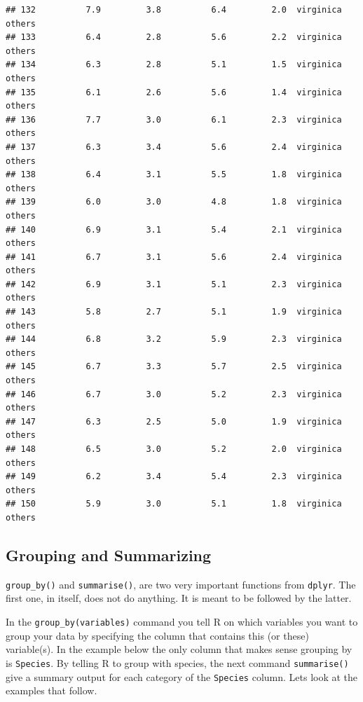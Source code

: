\documentclass[
]{book}
\begin{document}
\begin{verbatim}
## 132          7.9         3.8          6.4         2.0  virginica     others
## 133          6.4         2.8          5.6         2.2  virginica     others
## 134          6.3         2.8          5.1         1.5  virginica     others
## 135          6.1         2.6          5.6         1.4  virginica     others
## 136          7.7         3.0          6.1         2.3  virginica     others
## 137          6.3         3.4          5.6         2.4  virginica     others
## 138          6.4         3.1          5.5         1.8  virginica     others
## 139          6.0         3.0          4.8         1.8  virginica     others
## 140          6.9         3.1          5.4         2.1  virginica     others
## 141          6.7         3.1          5.6         2.4  virginica     others
## 142          6.9         3.1          5.1         2.3  virginica     others
## 143          5.8         2.7          5.1         1.9  virginica     others
## 144          6.8         3.2          5.9         2.3  virginica     others
## 145          6.7         3.3          5.7         2.5  virginica     others
## 146          6.7         3.0          5.2         2.3  virginica     others
## 147          6.3         2.5          5.0         1.9  virginica     others
## 148          6.5         3.0          5.2         2.0  virginica     others
## 149          6.2         3.4          5.4         2.3  virginica     others
## 150          5.9         3.0          5.1         1.8  virginica     others
\end{verbatim}

\hypertarget{grouping-and-summarizing}{%
\subsection{Grouping and Summarizing}\label{grouping-and-summarizing}}

\texttt{group\_by()} and \texttt{summarise()}, are two very important functions from \texttt{dplyr}.
The first one, in itself, does not do anything.
It is meant to be followed by the latter.

In the \texttt{group\_by(variables)} command you tell R on which variables you want to group your data by specifying the column that contains this (or these) variable(s).
In the example below the only column that makes sense grouping by is \texttt{Species}.
By telling R to group with species, the next command \texttt{summarise()} give a summary output for each category of the \texttt{Species} column.
Lets look at the examples that follow.
\end{document}
